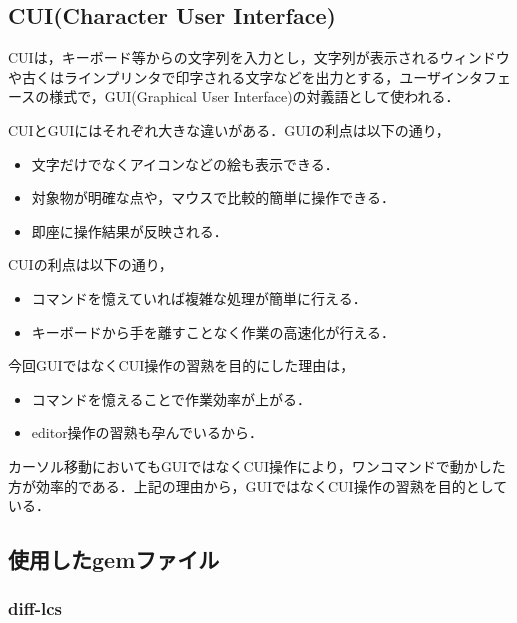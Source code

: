\documentclass[11pt,dvipdfmx]{jsarticle}
\providecommand{\tightlist}{%
      \setlength{\itemsep}{0pt}\setlength{\parskip}{0pt}}
\begin{document}
    \subsection{CUI(Character User
Interface)}\label{cuicharacter-user-interface}

CUIは，キーボード等からの文字列を入力とし，文字列が表示されるウィンドウや古くはラインプリンタで印字される文字などを出力とする，ユーザインタフェースの様式で，GUI(Graphical
User Interface)の対義語として使われる．

CUIとGUIにはそれぞれ大きな違いがある．GUIの利点は以下の通り，

\begin{itemize}
\tightlist
\item
  文字だけでなくアイコンなどの絵も表示できる．
\item
  対象物が明確な点や，マウスで比較的簡単に操作できる．
\item
  即座に操作結果が反映される．
\end{itemize}

CUIの利点は以下の通り，

\begin{itemize}
\tightlist
\item
  コマンドを憶えていれば複雑な処理が簡単に行える．
\item
  キーボードから手を離すことなく作業の高速化が行える．
\end{itemize}

今回GUIではなくCUI操作の習熟を目的にした理由は，

\begin{itemize}
\tightlist
\item
  コマンドを憶えることで作業効率が上がる．
\item
  editor操作の習熟も孕んでいるから．
\end{itemize}

カーソル移動においてもGUIではなくCUI操作により，ワンコマンドで動かした方が効率的である．上記の理由から，GUIではなくCUI操作の習熟を目的としている．

    \subsection{使用したgemファイル}\label{ux4f7fux7528ux3057ux305fgemux30d5ux30a1ux30a4ux30eb}

    \subsubsection{diff-lcs}\label{diff-lcs}
\end{document}
